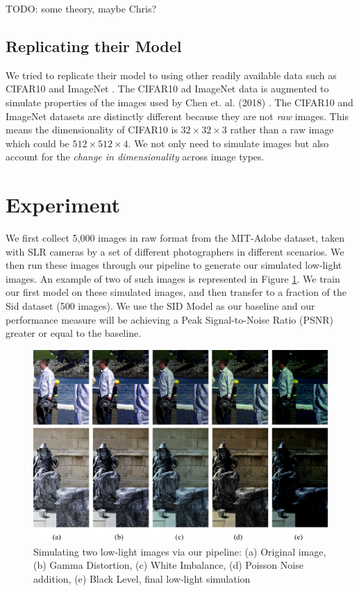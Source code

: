 \documentclass{article}
\begin{document}
TODO: some theory, maybe Chris?

\subsection{Replicating their Model}

We tried to replicate their model to using other readily
available data such as CIFAR10 \cite{cifar10} and ImageNet
\cite{imagenet_cvpr09}. The CIFAR10 ad ImageNet data is augmented to
simulate properties of the images used by Chen et. al. (2018)
\cite{chen2018learning}. The CIFAR10 and ImageNet datasets are distinctly
different because they are not \textit{raw} images. This means the
dimensionality of CIFAR10 is $32 \times 32 \times 3$ rather than a raw
image which could be $512 \times 512 \times 4$. We not only need to
simulate images but also account for the \textit{change in dimensionality}
across image types.



\section{Experiment}

We first collect 5,000 images in raw format from the MIT-Adobe dataset, taken with SLR cameras by a set of different photographers in different scenarios. We then run these images through our pipeline to generate our simulated low-light images. An example of two of such images is represented in
Figure \ref{fig:simulate}. We train our first model on these simulated
images, and then transfer to a fraction of the Sid dataset (500 images). We
use the SID Model as our baseline and our
performance measure will be achieving a Peak Signal-to-Noise Ratio (PSNR)
greater or equal to the baseline.


\begin{figure}[ht]
  \centering
  \includegraphics[scale=0.3]{fig3.png}
  \caption{Simulating two low-light images via our pipeline: (a) Original
    image, (b) Gamma Distortion, (c) White Imbalance, (d) Poisson Noise addition, (e) Black Level, final low-light simulation}
  \label{fig:simulate}
\end{figure}
\end{document}
